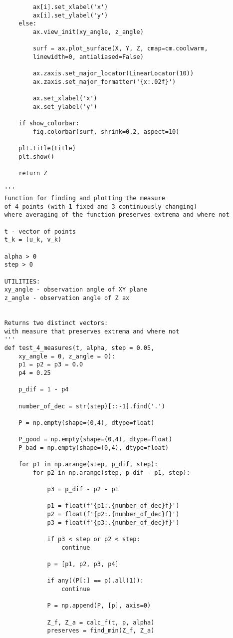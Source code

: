 \documentclass[12pt]{article}
\begin{document}
\begin{verbatim}
			ax[i].set_xlabel('x')
			ax[i].set_ylabel('y')
		else:
			ax.view_init(xy_angle, z_angle)
		
			surf = ax.plot_surface(X, Y, Z, cmap=cm.coolwarm,
			linewidth=0, antialiased=False)
			
			ax.zaxis.set_major_locator(LinearLocator(10))
			ax.zaxis.set_major_formatter('{x:.02f}')
			
			ax.set_xlabel('x')
			ax.set_ylabel('y')
		
		if show_colorbar:
			fig.colorbar(surf, shrink=0.2, aspect=10)
		
		plt.title(title)
		plt.show()
		
		return Z
		
	'''
	Function for finding and plotting the measure
	of 4 points (with 1 fixed and 3 continuously changing)
	where averaging of the function preserves extrema and where not
	
	t - vector of points
	t_k = (u_k, v_k)
	
	alpha > 0
	step > 0
	
	UTILITIES:
	xy_angle - observation angle of XY plane
	z_angle - observation angle of Z ax
	
	
	Returns two distinct vectors:
	with measure that preserves extrema and where not
	'''
	def test_4_measures(t, alpha, step = 0.05, 
		xy_angle = 0, z_angle = 0):
		p1 = p2 = p3 = 0.0
		p4 = 0.25
		
		p_dif = 1 - p4
		
		number_of_dec = str(step)[::-1].find('.')
		
		P = np.empty(shape=(0,4), dtype=float)
		
		P_good = np.empty(shape=(0,4), dtype=float)
		P_bad = np.empty(shape=(0,4), dtype=float)
		
		for p1 in np.arange(step, p_dif, step):
			for p2 in np.arange(step, p_dif - p1, step):
			
				p3 = p_dif - p2 - p1
				
				p1 = float(f'{p1:.{number_of_dec}f}')
				p2 = float(f'{p2:.{number_of_dec}f}')
				p3 = float(f'{p3:.{number_of_dec}f}')
				
				if p3 < step or p2 < step:
					continue
				
				p = [p1, p2, p3, p4]
				
				if any((P[:] == p).all(1)):
					continue
				
				P = np.append(P, [p], axis=0)
				
				Z_f, Z_a = calc_f(t, p, alpha)
				preserves = find_min(Z_f, Z_a)
				

\end{verbatim}
\end{document}
